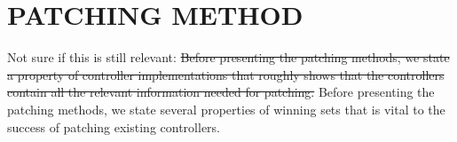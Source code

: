 
\section{PATCHING METHOD}
\label{sec:method}

{\color{red} Not sure if this is still relevant: } \sout{Before presenting the patching methods, we state a property of controller implementations that roughly shows that the controllers contain all the relevant information needed for patching. } Before presenting the patching methods, we state several properties of winning sets that is vital to the success of patching existing controllers.

